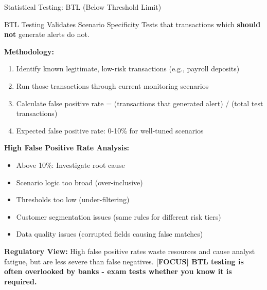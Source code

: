 \documentclass[11pt,a4paper]{beamer}
\newcommand{\examfocus}[1]{\textcolor{orange!80!black}{\textbf{[FOCUS] #1}}}
\begin{document}
\begin{frame}{Statistical Testing: BTL (Below Threshold Limit)}
	\begin{block}{BTL Testing Validates Scenario Specificity}
		Tests that transactions which \textbf{should not} generate alerts do not.
	\end{block}
	\textbf{Methodology:}
	\begin{enumerate}
		\item Identify known legitimate, low-risk transactions (e.g., payroll deposits)
		\item Run those transactions through current monitoring scenarios
		\item Calculate false positive rate = (transactions that generated alert) / (total test transactions)
		\item Expected false positive rate: 0-10\% for well-tuned scenarios
	\end{enumerate}
	\textbf{High False Positive Rate Analysis:}
	\begin{itemize}
		\item Above 10\%: Investigate root cause
		\item Scenario logic too broad (over-inclusive)
		\item Thresholds too low (under-filtering)
		\item Customer segmentation issues (same rules for different risk tiers)
		\item Data quality issues (corrupted fields causing false matches)
	\end{itemize}
	\textbf{Regulatory View:} High false positive rates waste resources and cause analyst fatigue, but are less severe than false negatives.
	\examfocus{BTL testing is often overlooked by banks - exam tests whether you know it is required.}
\end{frame}
\end{document}
